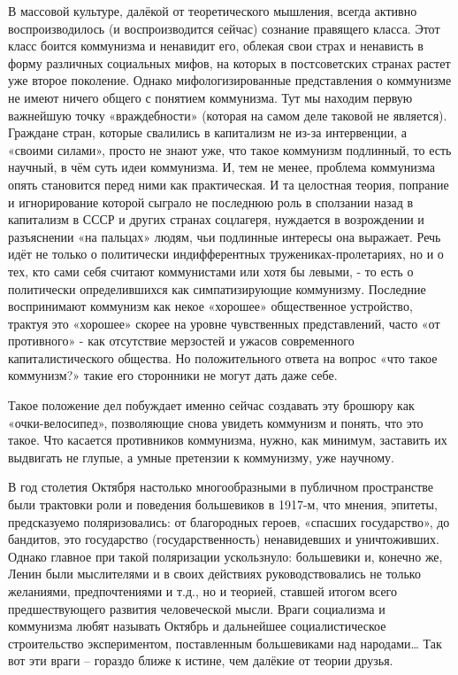 \documentclass[../main]{subfiles}
\begin{document}
В массовой культуре, далёкой от теоретического мышления, всегда активно воспроизводилось (и воспроизводится сейчас) сознание правящего класса. Этот класс боится коммунизма и ненавидит его, облекая свои страх и ненависть в форму различных социальных мифов, на которых в постсоветских странах растет уже второе поколение. Однако мифологизированные представления о коммунизме не имеют ничего общего с понятием коммунизма. Тут мы находим первую важнейшую точку «враждебности» (которая на самом деле таковой не является). Граждане стран, которые свалились в капитализм не из-за интервенции, а «своими силами», просто не знают уже, что такое коммунизм подлинный, то есть научный, в чём суть идеи коммунизма. И, тем не менее, проблема коммунизма опять становится перед ними как практическая. И та целостная теория, попрание и игнорирование которой сыграло не последнюю роль в сползании назад в капитализм в СССР и других странах соцлагеря, нуждается в возрождении и разъяснении «на пальцах» людям, чьи подлинные интересы она выражает. Речь идёт не только о политически индифферентных тружениках-пролетариях, но и о тех, кто сами себя считают коммунистами или хотя бы левыми, - то есть о политически определившихся как симпатизирующие коммунизму. Последние воспринимают коммунизм как некое «хорошее» общественное устройство, трактуя это «хорошее» скорее на уровне чувственных представлений, часто «от противного» - как отсутствие мерзостей и ужасов современного капиталистического общества. Но положительного ответа на вопрос «что такое коммунизм?» такие его сторонники не могут дать даже себе.

Такое положение дел побуждает именно сейчас создавать эту брошюру как «очки-велосипед», позволяющие снова увидеть коммунизм и понять, что это такое. Что касается противников коммунизма, нужно, как минимум, заставить их выдвигать не глупые, а умные претензии к коммунизму, уже научному.

В год столетия Октября настолько многообразными в публичном пространстве были трактовки роли и поведения большевиков в 1917-м, что мнения, эпитеты, предсказуемо поляризовались: от благородных героев, «спасших государство», до бандитов, это государство (государственность) ненавидевших и уничтоживших. Однако главное при такой поляризации ускользнуло: большевики и, конечно же, Ленин были мыслителями и в своих действиях руководствовались не только желаниями, предпочтениями и т.д., но и теорией, ставшей итогом всего предшествующего развития человеческой мысли. Враги социализма и коммунизма любят называть Октябрь и дальнейшее социалистическое строительство экспериментом, поставленным большевиками над народами… Так вот эти враги – гораздо ближе к истине, чем далёкие от теории друзья.
\end{document}
